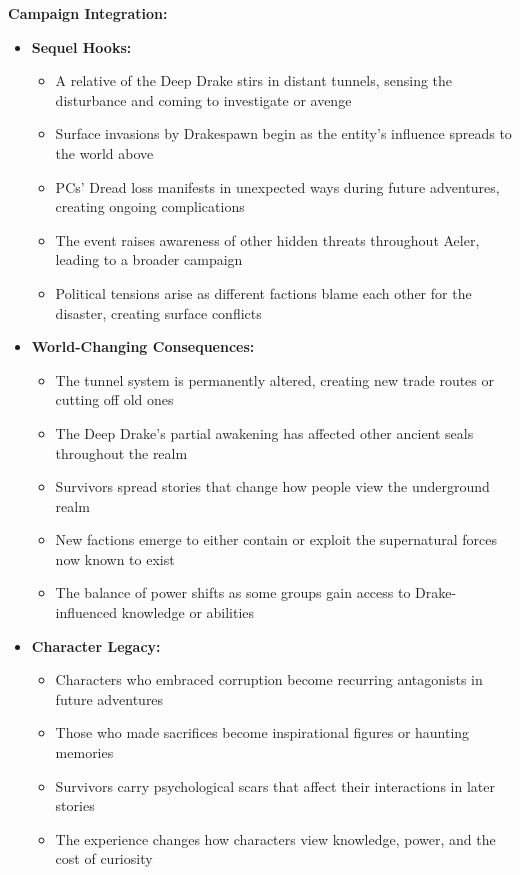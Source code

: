 \documentclass[11pt]{article}
\begin{document}
\textbf{Campaign Integration:}
\begin{itemize}
\item \textbf{Sequel Hooks:}
  \begin{itemize}
  \item A relative of the Deep Drake stirs in distant tunnels, sensing the disturbance and coming to investigate or avenge
  \item Surface invasions by Drakespawn begin as the entity's influence spreads to the world above
  \item PCs' Dread loss manifests in unexpected ways during future adventures, creating ongoing complications
  \item The event raises awareness of other hidden threats throughout Aeler, leading to a broader campaign
  \item Political tensions arise as different factions blame each other for the disaster, creating surface conflicts
  \end{itemize}
\item \textbf{World-Changing Consequences:}
  \begin{itemize}
  \item The tunnel system is permanently altered, creating new trade routes or cutting off old ones
  \item The Deep Drake's partial awakening has affected other ancient seals throughout the realm
  \item Survivors spread stories that change how people view the underground realm
  \item New factions emerge to either contain or exploit the supernatural forces now known to exist
  \item The balance of power shifts as some groups gain access to Drake-influenced knowledge or abilities
  \end{itemize}
\item \textbf{Character Legacy:}
  \begin{itemize}
  \item Characters who embraced corruption become recurring antagonists in future adventures
  \item Those who made sacrifices become inspirational figures or haunting memories
  \item Survivors carry psychological scars that affect their interactions in later stories
  \item The experience changes how characters view knowledge, power, and the cost of curiosity
  \end{itemize}
\end{itemize}
\end{document}
